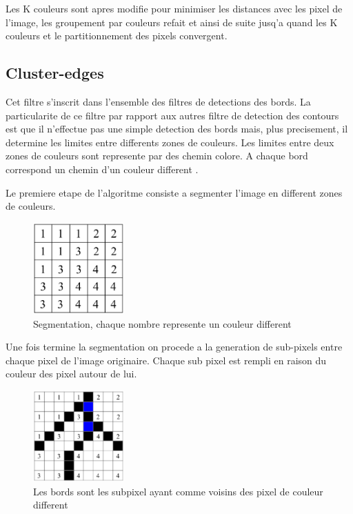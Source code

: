 \documentclass[twoside,openright,a4paper,11pt,french]{article}
\begin{document}
Les K couleurs sont apres modifie pour minimiser les distances avec
les pixel de l'image, les groupement par couleurs refait et ainsi de
suite jusq'a quand les K couleurs et le partitionnement des pixels
convergent. 

\subsection{Cluster-edges}
Cet filtre s'inscrit dans l'ensemble des filtres de detections des
bords. La particularite de ce filtre par rapport aux autres filtre de
detection des contours est que il n'effectue pas une simple detection
des bords mais, plus precisement, il determine les limites entre
differents zones de couleurs. 
Les limites entre deux zones de couleurs sont represente par des
chemin colore. A chaque bord correspond un chemin d'un couleur
different \cite{url-novelvect}.

Le premiere etape de l'algoritme consiste a segmenter l'image en
different zones de couleurs.

\begin{figure}[h]
\centering
\includegraphics[width=3.5cm]{./pics/cluster-edges1.eps}
\caption{Segmentation, chaque nombre represente un couleur different}
\label{fig:routcidr}
\end{figure}

Une fois termine la segmentation on procede a la generation de
sub-pixels entre chaque pixel de l'image originaire. Chaque sub pixel
est rempli en raison du couleur des pixel autour de lui.

\begin{figure}[h]
\centering
\includegraphics[width=3.5cm]{./pics/cluster-edges2.eps}
\caption{Les bords sont les subpixel ayant comme voisins des pixel de
couleur different}
\label{fig:routcidr}
\end{figure}
\end{document}
